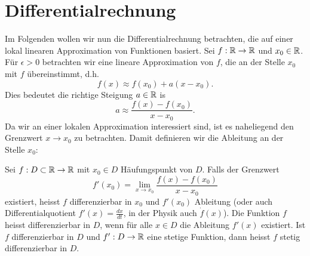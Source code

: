 \chapter{Differentialrechnung}
\label{\detokenize{differential/differential:differentialrechnung}}\label{\detokenize{differential/differential::doc}}
Im Folgenden wollen wir nun die Differentialrechnung betrachten, die auf einer lokal linearen Approximation von Funktionen basiert. Sei \(f: \mathbb{R} \rightarrow \mathbb{R}\) und \(x_0 \in \mathbb{R}\). Für \(\epsilon > 0\) betrachten wir eine lineare Approximation von \(f\), die an der Stelle \(x_0\) mit \(f\) übereinstimmt, d.h.
\begin{equation*}
 f(x) \approx f(x_0) + a (x-x_0).
\end{equation*}
Dies bedeutet die richtige Steigung \(a \in \mathbb{R}\) is
\begin{equation*}
 a \approx \frac{f(x)-f(x_0)}{x-x_0} .
\end{equation*}
Da wir an einer lokalen Approximation interessiert sind, ist es naheliegend den Grenzwert \(x \rightarrow x_0\) zu betrachten. Damit definieren wir die Ableitung an der Stelle \(x_0\):
\label{differential/differential:definition-0}
\begin{definition}{}{}



Sei \(f: D \subset \mathbb{R} \rightarrow \mathbb{R}\) mit \(x_0 \in D\) Häufungspunkt von \(D\). Falls der Grenzwert
\begin{equation*}
 f'(x_0) = \lim_{x \rightarrow x_0} \frac{f(x) - f(x_0)}{x-x_0}
\end{equation*}
existiert, heisst \(f\) differenzierbar in \(x_0\) und \(f'(x_0)\) Ableitung  (oder auch Differentialquotient \(f'(x) = \frac{dx}{dt}\), in der Physik auch \(\dot f(x)\)). Die Funktion \(f\) heisst differenzierbar in \(D\), wenn für alle \(x \in D\) die Ableitung \(f'(x)\) existiert.
Ist \(f\) differenzierbar in \(D\) und \(f':D \rightarrow \mathbb{R}\) eine stetige Funktion, dann heisst \(f\) stetig differenzierbar in \(D\).
\end{definition}

